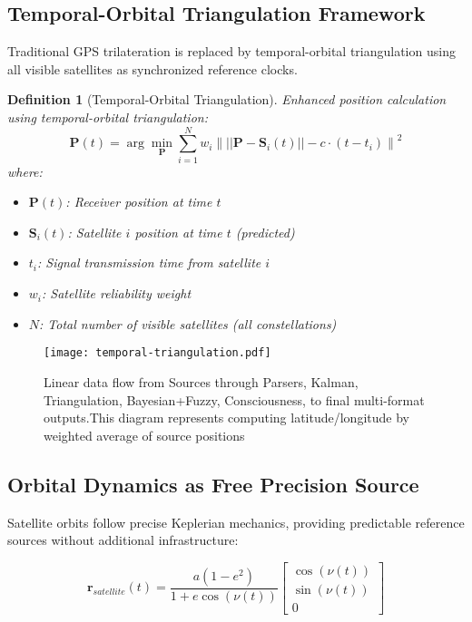 \documentclass[12pt,a4paper]{article}
\newtheorem{definition}[theorem]{Definition}
\begin{document}
\subsection{Temporal-Orbital Triangulation Framework}

Traditional GPS trilateration is replaced by temporal-orbital triangulation using all visible satellites as synchronized reference clocks.

\begin{definition}[Temporal-Orbital Triangulation]
Enhanced position calculation using temporal-orbital triangulation:
\begin{equation}
\mathbf{P}(t) = \arg\min_{\mathbf{P}} \sum_{i=1}^{N} w_i \left\| ||\mathbf{P} - \mathbf{S}_i(t)|| - c \cdot (t - t_i) \right\|^2
\end{equation}
where:
\begin{itemize}
\item $\mathbf{P}(t)$: Receiver position at time $t$
\item $\mathbf{S}_i(t)$: Satellite $i$ position at time $t$ (predicted)
\item $t_i$: Signal transmission time from satellite $i$
\item $w_i$: Satellite reliability weight
\item $N$: Total number of visible satellites (all constellations)
\end{itemize}
\end{definition}

\begin{figure}[H]
\centering
\texttt{[image: temporal-triangulation.pdf]}
\caption{Linear data flow from Sources through Parsers, Kalman, Triangulation, Bayesian+Fuzzy, Consciousness, to final multi-format outputs.This diagram represents computing latitude/longitude by weighted average of source positions}
\label{fig:temporal-triangulation}
\end{figure}

\subsection{Orbital Dynamics as Free Precision Source}

Satellite orbits follow precise Keplerian mechanics, providing predictable reference sources without additional infrastructure:

\begin{equation}
\mathbf{r}_{satellite}(t) = \frac{a(1-e^2)}{1+e\cos(\nu(t))} \begin{bmatrix} \cos(\nu(t)) \\ \sin(\nu(t)) \\ 0 \end{bmatrix}
\end{equation}
\end{document}
